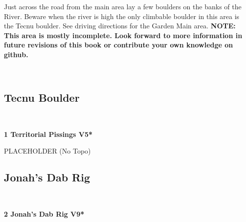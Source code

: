 \raggedcolumns
\begin{multicols}{2}
\begin{minipage}{\columnwidth}
Just across the road from the main area lay a few boulders on the banks of the River. Beware when the river is high the only climbable boulder in this area is the Tecnu boulder. See driving directions for the Garden Main area.
\newline
\textbf{NOTE: This area is mostly incomplete. Look forward to more information in future revisions of this book or contribute your own knowledge on github.}
\end{minipage}

\newpage
	\begin{minipage}{\columnwidth}
	\
	\end{minipage}
	
			\begin{minipage}{\columnwidth}
			\subsection*{Tecnu Boulder}\label{bf:Tecnu Boulder}
			\
			
			\end{minipage}
			
					\begin{minipage}{\linewidth}	
					\label{rt:Territorial Pissings}
\colorbox{RoyalBlue!20}{
\parbox{0.95\textwidth}{
\textbf{
1 Territorial Pissings V5*  
}
}
}

					\begin{adjustwidth}{0.5cm}{}				
					PLACEHOLDER
						\newline (No Topo) 
					\end{adjustwidth}
					\end{minipage}
			\begin{minipage}{\columnwidth}
			\subsection*{Jonah's Dab Rig}\label{bf:Jonah's Dab Rig}
			\
			
			\end{minipage}
			
					\begin{minipage}{\linewidth}	
					\label{rt:Jonah's Dab Rig}
\colorbox{Goldenrod!50}{
\parbox{0.95\textwidth}{
\textbf{
2 Jonah's Dab Rig V9*  
}
}
}


\end{minipage}
\end{multicols}
